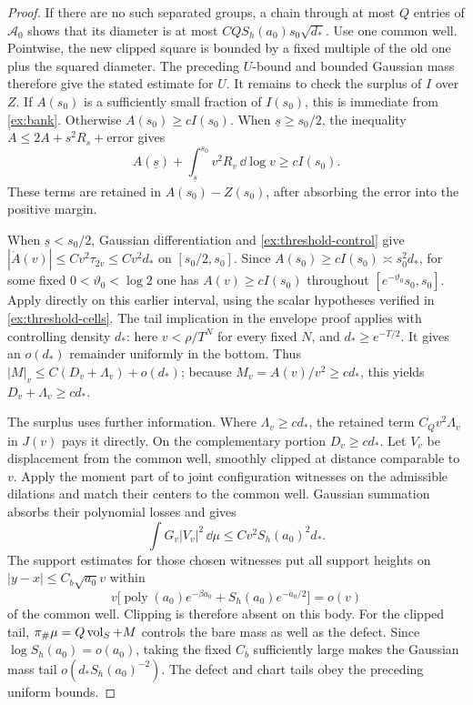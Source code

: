 \begin{proof}
If there are no such separated groups, a chain through at most
\(Q\) entries of \(\mathcal A_0\) shows that its diameter is at most
\(CQS_h(a_0)s_0\sqrt{d_*}\). Use one common well.
Pointwise, the new clipped square is bounded by a fixed multiple of
the old one plus the squared diameter. The preceding \(U\)-bound and
bounded Gaussian mass therefore give the stated estimate for \(U\).
It remains to check the surplus of \(I\) over \(Z\). If
\(A(s_0)\) is a sufficiently small fraction of \(I(s_0)\), this is
immediate from \eqref{ex:bank}. Otherwise
\(A(s_0)\ge cI(s_0)\). When \(\underline s\ge s_0/2\), the
inequality \(\dot A\le2A+s^2R_s+\text{error}\) gives
\[
 A(\underline s)+\int_{\underline s}^{s_0}v^2R_v\,\dd\log v
 \ge cI(s_0).
\]
These terms are retained in \(A(s_0)-Z(s_0)\), after absorbing the
error into the positive margin.

When \(\underline s<s_0/2\), Gaussian differentiation and
\eqref{ex:threshold-control} give
\(|\dot A(v)|\le Cv^2\tau_{2v}\le Cv^2d_*\) on \([s_0/2,s_0]\).
Since \(A(s_0)\ge cI(s_0)\asymp s_0^2d_*\), for some fixed
\(0<\vartheta_0<\log2\) one has \(A(v)\ge cI(s_0)\) throughout
\([e^{-\vartheta_0}s_0,s_0]\). Apply  directly
on this earlier interval, using the scalar hypotheses verified in
\eqref{ex:threshold-cells}. The tail implication in the envelope
proof applies with controlling density \(d_*\): here
\(v<\rho/T^N\) for every fixed \(N\), and \(d_*\ge e^{-T/2}\).
It gives an \(o(d_*)\) remainder uniformly in the bottom. Thus
\(|M|_v\le C(D_v+\Lambda_v)+o(d_*)\); because
\(M_v=A(v)/v^2\ge cd_*\), this yields \(D_v+\Lambda_v\ge cd_*\).

The surplus uses further information. Where \(\Lambda_v\ge cd_*\),
the retained term \(C_Qv^2\Lambda_v\) in \(J(v)\) pays it directly.
On the complementary portion \(D_v\ge cd_*\). Let \(V_v\) be
displacement from the common well, smoothly clipped at distance
comparable to \(v\). Apply the moment part of 
to joint configuration witnesses on the admissible dilations and
match their centers to the common well. Gaussian summation absorbs
their polynomial losses and gives
\[
 \int G_v|V_v|^2\,\dd\mu
 \le Cv^2S_h(a_0)^2d_*.
\]
The support estimates for those chosen witnesses put all support
heights on \(|y-x|\le C_b\sqrt{a_0}v\) within
\[
 v\bigl[\operatorname{poly}(a_0)e^{-\beta a_0}
              +S_h(a_0)e^{-a_0/2}\bigr]=o(v)
\]
of the common well. Clipping is therefore absent on this body.
For the clipped tail, \(\pi_\#\mu=Q\operatorname{vol}_S+M\) controls the bare
mass as well as the defect. Since \(\log S_h(a_0)=o(a_0)\), taking
the fixed \(C_b\) sufficiently large makes the Gaussian mass tail
\(o(d_*S_h(a_0)^{-2})\). The defect and chart tails obey the
preceding uniform bounds.


\end{proof}
